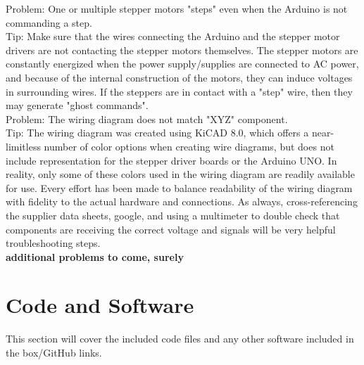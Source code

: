 \documentclass[12pt,oneside,letterpaper]{article}
\begin{document}
Problem: One or multiple stepper motors "steps" even when the Arduino is not commanding a step. \\
Tip: Make sure that the wires connecting the Arduino and the stepper motor drivers are not contacting the stepper motors themselves. The stepper motors are constantly energized when the power supply/supplies are connected to AC power, and because of the internal construction of the motors, they can induce voltages in surrounding wires. If the steppers are in contact with a "step" wire, then they may generate "ghost commands".\\

Problem: The wiring diagram does not match "XYZ" component. \\
Tip: The wiring diagram was created using KiCAD 8.0, which offers a near-limitless number of color options when creating wire diagrams, but does not include representation for the stepper driver boards or the Arduino UNO. In reality, only some of these colors used in the wiring diagram are readily available for use. Every effort has been made to balance readability of the wiring diagram with fidelity to the actual hardware and connections.  As always, cross-referencing the supplier data sheets, google, and using a multimeter to double check that components are receiving the correct voltage and signals will be very helpful troubleshooting steps.\\

\textbf{additional problems to come, surely}

\section{Code and Software}
This section will cover the included code files and any other software included in the box/GitHub links.
\end{document}
